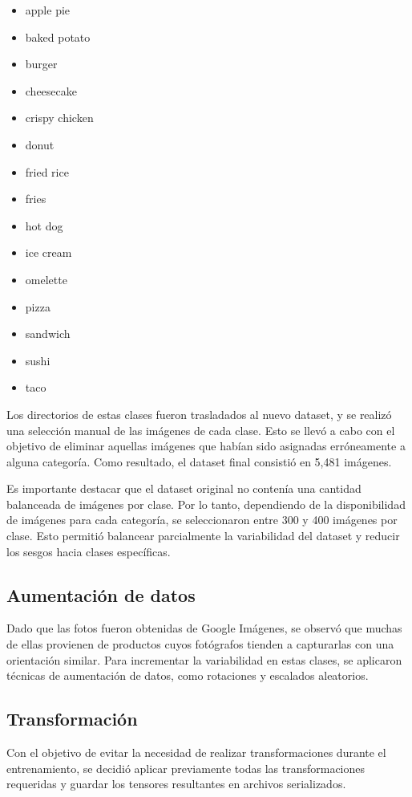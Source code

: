 \documentclass[twocolumn]{article}
\begin{document}
\begin{itemize} 
    \setlength\itemsep{-0.5em}
    \item apple pie
    \item baked potato
    \item burger
    \item cheesecake
    \item crispy chicken
    \item donut
    \item fried rice
    \item fries
    \item hot dog
    \item ice cream
    \item omelette
    \item pizza
    \item sandwich
    \item sushi
    \item taco
\end{itemize}

Los directorios de estas clases fueron trasladados al nuevo dataset, y se realizó una selección manual de las imágenes de cada clase. Esto se llevó a cabo con el objetivo de eliminar aquellas imágenes que habían sido asignadas erróneamente a alguna categoría. Como resultado, el dataset final consistió en 5,481 imágenes.

Es importante destacar que el dataset original no contenía una cantidad balanceada de imágenes por clase. Por lo tanto, dependiendo de la disponibilidad de imágenes para cada categoría, se seleccionaron entre 300 y 400 imágenes por clase. Esto permitió balancear parcialmente la variabilidad del dataset y reducir los sesgos hacia clases específicas.

\subsection{Aumentación de datos} 
Dado que las fotos fueron obtenidas de Google Imágenes, se observó que muchas de ellas provienen de productos cuyos fotógrafos tienden a capturarlas con una orientación similar. Para incrementar la variabilidad en estas clases, se aplicaron técnicas de aumentación de datos, como rotaciones y escalados aleatorios.

\subsection{Transformación} 
Con el objetivo de evitar la necesidad de realizar transformaciones durante el entrenamiento, se decidió aplicar previamente todas las transformaciones requeridas y guardar los tensores resultantes en archivos serializados.
\end{document}
